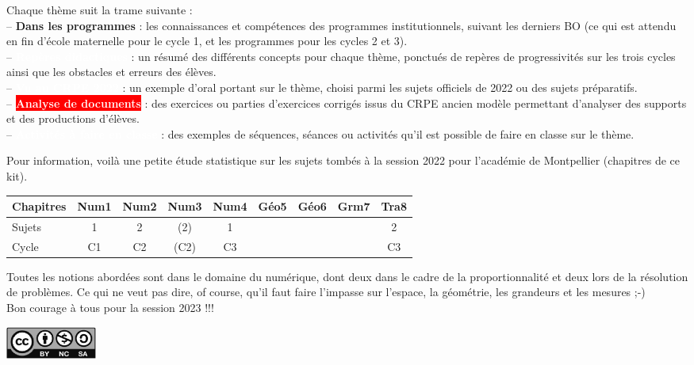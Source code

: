 Chaque thème suit la trame suivante : \\ [2mm]
   -- {\textcolor{B2}{\sffamily\bfseries Dans les programmes}} : les connaissances et compétences des programmes institutionnels, suivant les derniers BO (ce qui est attendu en fin d'école maternelle pour le cycle 1, et les programmes pour les cycles 2 et 3). \\ [2mm]
   -- \colorbox{A2}{\textcolor{white}{\sffamily\bfseries Repères didactiques}} : un résumé des différents concepts pour chaque thème, ponctués de repères de progressivités sur les trois cycles ainsi que les obstacles et erreurs des élèves. \\ [2mm]
   -- \colorbox{G1}{\textcolor{white}{\sffamily\bfseries Vu au CRPE 2022}} : un exemple d'oral portant sur le thème, choisi parmi les sujets officiels de 2022 ou des sujets préparatifs. \\ [2mm]
   -- \colorbox{red}{\textcolor{white}{\sffamily\bfseries Analyse de documents}} : des exercices ou parties d'exercices corrigés issus du {\small CRPE} \og ancien modèle \fg{} permettant d'analyser des supports et des productions d'élèves. \\  [2mm]
    -- \colorbox{PartieStatistique}{\textcolor{white}{\sffamily\bfseries Activités à faire en classe}} : des exemples de séquences, séances ou activités qu'il est possible de faire en classe sur le thème.

   \vfill
   
   Pour information, voilà une petite étude statistique sur les sujets tombés à la session 2022 pour l'académie de Montpellier (chapitres de ce kit).
   
   \begin{center}
      {
      \begin{tabular}{|p{2.3cm}|*{8}{C{1}|}}
         \hline
         Chapitres & Num1 & Num2 & Num3 & Num4 & Géo5 & Géo6 & Grm7 & Tra8 \\
         \hline
         Sujets & 1 & 2 & (2) & 1 & & & & 2  \\
         \hline
         Cycle & C1 & C2 & (C2) & C3 & & & & C3 \\
         \hline
      \end{tabular}}
   \end{center}

Toutes les notions abordées sont dans le domaine du numérique, dont deux dans le cadre de la proportionnalité et deux lors de la résolution de problèmes. Ce qui ne veut pas dire, of course, qu'il faut faire l'impasse sur l'espace, la géométrie, les grandeurs et les mesures ;-) \\

Bon courage à tous pour la session 2023 !!! \\

\begin{center}
   \includegraphics[width=3cm]{Annexes/Images/Licence}
\end{center}

